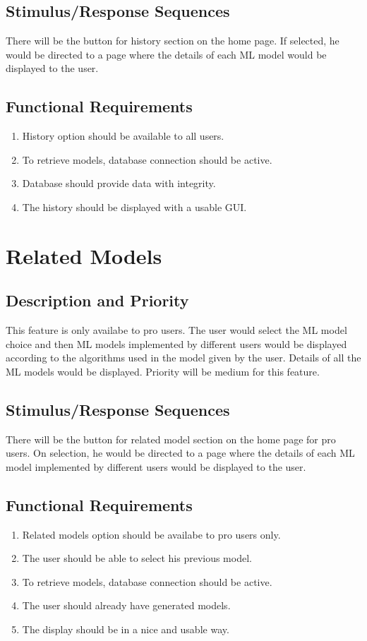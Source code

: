 \documentclass[12pt]{scrreprt}
\begin{document}
\subsection{Stimulus/Response Sequences}
 There will be the button for history section on the home page. If selected, he would be directed to a page where the details of each ML model would be displayed to the user.

\subsection{Functional Requirements}
\begin{enumerate}
\item History option should be available to all users.
\item To retrieve models, database connection should be active.
\item Database should provide data with integrity.
\item The history should be displayed with a usable GUI.
\end{enumerate}

\section{Related Models}

\subsection{Description and Priority}
This feature is only availabe to pro users.
The user would select the ML model choice and then ML models implemented by different users would be displayed according to the algorithms used in the model given by the user. Details of all the ML models would be displayed. Priority will be medium for this feature.

\subsection{Stimulus/Response Sequences}
 There will be the button for related model section on the home page for pro users. On selection, he would be directed to a page where the details of each ML model implemented by different users would be displayed to the user.

\subsection{Functional Requirements}
\begin{enumerate}
\item Related models option should be availabe to pro users only.
\item The user should be able to select his previous model.
\item To retrieve models, database connection should be active.
\item The user should already have generated models.
\item The display should be in a nice and usable way.
\end{enumerate}
\end{document}
